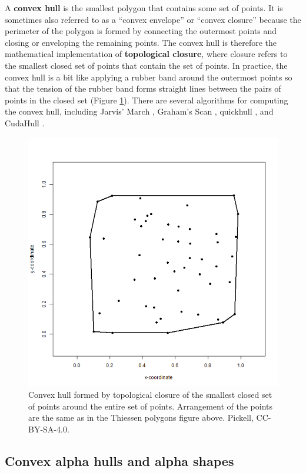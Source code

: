\documentclass[
]{book}
\begin{document}
A \textbf{convex hull} is the smallest polygon that contains some set of points. It is sometimes also referred to as a ``convex envelope'' or ``convex closure'' because the perimeter of the polygon is formed by connecting the outermost points and closing or enveloping the remaining points. The convex hull is therefore the mathematical implementation of \textbf{topological closure}, where closure refers to the smallest closed set of points that contain the set of points. In practice, the convex hull is a bit like applying a rubber band around the outermost points so that the tension of the rubber band forms straight lines between the pairs of points in the closed set (Figure \ref{fig:7-2d-convex-hull}). There are several algorithms for computing the convex hull, including Jarvis' March \citep{jarvis_identification_1973}, Graham's Scan \citep{graham_efficient_1972}, quickhull \citep{barber_quickhull_1996}, and CudaHull \citep{stein_cudahull_2012}.

\begin{figure}
\includegraphics[width=0.75\linewidth]{images/07-2d-convex-hull} \caption{Convex hull formed by topological closure of the smallest closed set of points around the entire set of points. Arrangement of the points are the same as in the Thiessen polygons figure above. Pickell, CC-BY-SA-4.0.}\label{fig:7-2d-convex-hull}
\end{figure}

\hypertarget{convex-alpha-hulls-and-alpha-shapes}{%
\subsection{Convex alpha hulls and alpha shapes}\label{convex-alpha-hulls-and-alpha-shapes}}
\end{document}
